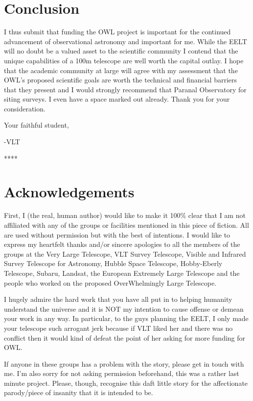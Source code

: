 \documentclass[12pt]{iopart}
\begin{document}
\section{Conclusion}
I thus submit that funding the OWL project is important for the continued advancement of observational astronomy and important for me. While the EELT will no doubt be a valued asset to the scientific community I contend that the unique capabilities of a 100m telescope are well worth the capital outlay. I hope that the academic community at large will agree with my assessment that the OWL's proposed scientific goals are worth the technical and financial barriers that they present and I would strongly recommend that Paranal Observatory for siting surveys. I even have a space marked out already. Thank you for your consideration.

Your faithful student,

-VLT

\begin{center}
****
\end{center}

\section{Acknowledgements}
First, I (the real, human author) would like to make it 100\% clear that I am not affiliated with any of the groups or facilities mentioned in this piece of fiction. All are used without permission but with the best of intentions.
I would like to express my heartfelt thanks and/or sincere apologies to all the members of the groups at the Very Large Telescope, VLT Survey Telescope, Visible and Infrared Survey Telescope for Astronomy, Hubble Space Telescope, Hobby-Eberly Telescope, Subaru, Landsat, the European Extremely Large Telescope and the people who worked on the proposed OverWhelmingly Large Telescope.

I hugely admire the hard work that you have all put in to helping humanity understand the universe and it is NOT my intention to cause offense or demean your work in any way. In particular, to the guys planning the EELT, I only made your telescope such arrogant jerk because if VLT liked her and there was no conflict then it would kind of defeat the point of her asking for more funding for OWL.

If anyone in these groups has a problem with the story, please get in touch with me. I'm also sorry for not asking permission beforehand, this was a rather last minute project. Please, though, recognise this daft little story for the affectionate parody/piece of insanity that it is intended to be.
\end{document}
